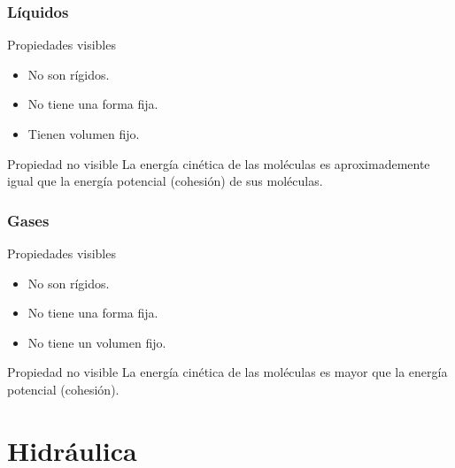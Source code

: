 \documentclass[handout]{beamer}
\begin{document}
\begin{frame}
  \frametitle{Líquidos}

  \begin{block}{Propiedades visibles}
    \begin{itemize}
    \item No son rígidos.
    \item No tiene una forma fija.
    \item Tienen volumen fijo.
    \end{itemize}
  \end{block}

  \begin{block}{Propiedad no visible}
    La energía cinética de las moléculas es aproximademente igual que la energía potencial
    (cohesión) de sus moléculas.
  \end{block}
  
\end{frame}



\begin{frame}
  \frametitle{Gases}

  \begin{block}{Propiedades visibles}
    \begin{itemize}
    \item No son rígidos.
    \item No tiene una forma fija.
    \item No tiene un volumen fijo.
    \end{itemize}
  \end{block}

  \begin{block}{Propiedad no visible}
    La energía cinética de las moléculas es mayor que la energía potencial
    (cohesión).
  \end{block}
  
\end{frame}



\section{Hidráulica}
\end{document}
